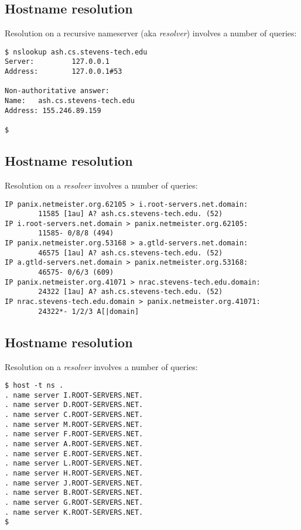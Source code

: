 \documentclass[xga]{xdvislides}
\begin{document}
\subsection{Hostname resolution}
Resolution on a recursive nameserver (aka {\em resolver}) involves a number of queries:
\vspace{.5in}
\begin{verbatim}
$ nslookup ash.cs.stevens-tech.edu
Server:         127.0.0.1
Address:        127.0.0.1#53

Non-authoritative answer:
Name:   ash.cs.stevens-tech.edu
Address: 155.246.89.159

$
\end{verbatim}

\subsection{Hostname resolution}
Resolution on a {\em resolver} involves a number of queries:
\begin{verbatim}
IP panix.netmeister.org.62105 > i.root-servers.net.domain:
        11585 [1au] A? ash.cs.stevens-tech.edu. (52)
IP i.root-servers.net.domain > panix.netmeister.org.62105:
        11585- 0/8/8 (494)
IP panix.netmeister.org.53168 > a.gtld-servers.net.domain:
        46575 [1au] A? ash.cs.stevens-tech.edu. (52)
IP a.gtld-servers.net.domain > panix.netmeister.org.53168:
        46575- 0/6/3 (609)
IP panix.netmeister.org.41071 > nrac.stevens-tech.edu.domain:
        24322 [1au] A? ash.cs.stevens-tech.edu. (52)
IP nrac.stevens-tech.edu.domain > panix.netmeister.org.41071:
        24322*- 1/2/3 A[|domain]
\end{verbatim}
\Normalsize

\subsection{Hostname resolution}
Resolution on a {\em resolver} involves a number of queries:
\begin{verbatim}
$ host -t ns .
. name server I.ROOT-SERVERS.NET.
. name server D.ROOT-SERVERS.NET.
. name server C.ROOT-SERVERS.NET.
. name server M.ROOT-SERVERS.NET.
. name server F.ROOT-SERVERS.NET.
. name server A.ROOT-SERVERS.NET.
. name server E.ROOT-SERVERS.NET.
. name server L.ROOT-SERVERS.NET.
. name server H.ROOT-SERVERS.NET.
. name server J.ROOT-SERVERS.NET.
. name server B.ROOT-SERVERS.NET.
. name server G.ROOT-SERVERS.NET.
. name server K.ROOT-SERVERS.NET.
$
\end{verbatim}
\end{document}
